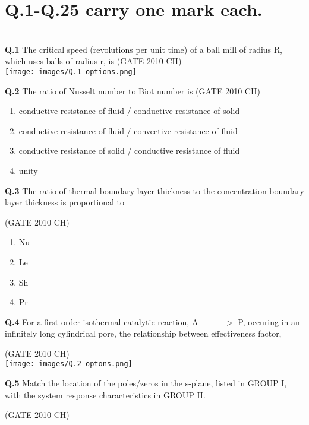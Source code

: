 \documentclass[journal,12pt,onecolumn]{exam}
\theoremstyle{remark}
\begin{document}
 \section{Q.1-Q.25 carry one mark each.}\\
 
 \noindent
 \textbf{Q.1}
    The critical speed (revolutions per unit time) of a ball mill of radius R, which uses balls of radius r, is 
\hfill{(GATE 2010 CH)}\\


    \texttt{[image: images/Q.1 options.png]}
   
   

 \noindent\textbf{Q.2}
   The ratio of Nusselt number to Biot number is
   \hfill{(GATE 2010 CH)}\\
\begin{enumerate}
    \item conductive resistance of fluid / conductive resistance of solid
    \item conductive resistance of fluid / convective resistance of fluid
    \item conductive resistance of solid / conductive resistance of fluid 
    \item unity
\end{enumerate}
\noindent
\textbf{Q.3}
  The ratio of thermal boundary layer thickness to the concentration boundary layer thickness is proportional to
  
  \hfill{(GATE 2010 CH)}\\
  
\begin{enumerate}
  \item Nu
  \item Le
  \item Sh
  \item Pr
\end{enumerate}
 \noindent
 \textbf{Q.4}
  For a first order isothermal catalytic reaction, A $--->$ P, occuring in an infinitely long cylindrical pore, the relationship between effectiveness factor,
  
\hfill{(GATE 2010 CH)}\\
 \texttt{[image: images/Q.2 optons.png]}
     

\noindent
 \textbf{Q.5}
  Match the location of the poles/zeros in the s-plane, listed in GROUP I, with the system response characteristics in GROUP II.
  
\hfill{(GATE 2010 CH)}\\
\end{document}
